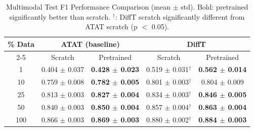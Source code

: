 \begin{table}[h]
\centering
\caption{Multimodal Test F1 Performance Comparison (mean $\pm$ std). Bold: pretrained significantly better than scratch. $^\dagger$: DiffT scratch significantly different from ATAT scratch (p $<$ 0.05).}
\label{tab:multimodal_comparison_sig}
\begin{tabular}{|c|cc|cc|}
\hline
\multirow{2}{*}{\% Data} & \multicolumn{2}{c|}{ATAT (baseline)} & \multicolumn{2}{c|}{DiffT} \\
\cline{2-5}
 & Scratch & Pretrained & Scratch & Pretrained \\
\hline
1 & 0.404 $\pm$ 0.037 & \textbf{0.428 $\pm$ 0.023} & 0.519 $\pm$ 0.031$^\dagger$ & \textbf{0.562 $\pm$ 0.014} \\
10 & 0.759 $\pm$ 0.008 & \textbf{0.782 $\pm$ 0.005} & 0.801 $\pm$ 0.003$^\dagger$ & 0.804 $\pm$ 0.009 \\
25 & 0.813 $\pm$ 0.003 & \textbf{0.827 $\pm$ 0.004} & 0.834 $\pm$ 0.003$^\dagger$ & \textbf{0.846 $\pm$ 0.005} \\
50 & 0.840 $\pm$ 0.003 & \textbf{0.850 $\pm$ 0.004} & 0.857 $\pm$ 0.004$^\dagger$ & \textbf{0.863 $\pm$ 0.004} \\
100 & 0.866 $\pm$ 0.003 & \textbf{0.869 $\pm$ 0.003} & 0.880 $\pm$ 0.002$^\dagger$ & \textbf{0.884 $\pm$ 0.003} \\
\hline
\end{tabular}
\end{table}